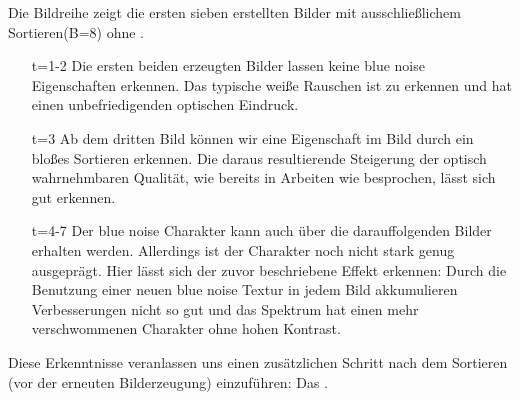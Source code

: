 Die Bildreihe zeigt die ersten sieben erstellten Bilder mit ausschließlichem 
Sortieren(B=8) ohne .

\begin{itemize}
    \item[t=1-2] Die ersten beiden erzeugten Bilder lassen keine blue noise Eigenschaften erkennen.
                    Das typische weiße Rauschen ist zu erkennen und hat einen unbefriedigenden optischen Eindruck.
                     \par 
                    
    \item[t=3] Ab dem dritten Bild können wir eine  Eigenschaft im Bild durch ein 
                bloßes Sortieren erkennen. Die daraus resultierende Steigerung der optisch wahrnehmbaren 
                Qualität, wie bereits in Arbeiten wie \cite{3288} besprochen, lässt sich gut erkennen. 
    \item[t=4-7] Der blue noise Charakter kann auch über die darauffolgenden Bilder erhalten werden.
                Allerdings ist der Charakter noch nicht stark genug ausgeprägt. Hier lässt sich der zuvor beschriebene 
                Effekt erkennen: Durch die Benutzung einer neuen blue noise Textur in jedem Bild akkumulieren 
                Verbesserungen nicht so gut und das Spektrum hat einen mehr verschwommenen Charakter ohne hohen 
                Kontrast.
\end{itemize}

Diese Erkenntnisse veranlassen uns einen zusätzlichen Schritt nach dem Sortieren (vor der erneuten Bilderzeugung) 
einzuführen: Das .